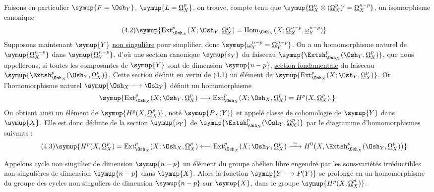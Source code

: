 Faisons en particulier $\symup{F=\Osh_Y}$, $\symup{L=\underline{\Omega}_X^{p}}$, on trouve, compte tenu
que $\symup{\underline{\Omega}_X^{n}\otimes(\underline{\Omega}_X^{p})'=\underline{\Omega}_X^{n-p}}$, un isomorphisme
canonique
\begin{equation}\tag{4.2}
  \symup{\operatorname{Ext}_{\Osh_X}^{p}(X;\Osh_Y,\underline{\Omega}_X^{p})
  =\operatorname{Hom}_{\Osh_X}
  (X;\underline{\Omega}_X^{n-p},\underline{\omega}_Y^{n-p})}
\end{equation}
Supposons maintenant $\symup{Y}$ \uline{non singulière} pour simplifier, donc
$\symup{\underline{\omega}_Y^{n-p}=\underline{\Omega}_Y^{n-p}}$. On a un homomorphisme naturel de
$\symup{\underline{\Omega}_X^{n-p}}$ dans $\symup{\underline{\Omega}_Y^{n-p}}$, d'où une section canonique $\symup{s_Y}$ du
faisceau $\symup{\Extsh_{\Osh_X}^{p}(\Osh_Y,\underline{\Omega}_X^{p})}$, que nous appellerons, si
toutes les composantes de $\symup{Y}$ sont de dimension $\symup{n-p}$, \uline{section
fondamentale} du faisceau $\symup{\Extsh_{\Osh_X}^{p}(\Osh_Y,\underline{\Omega}_X^{p})}$. Cette
section définit en vertu de (4.1) un élément de
$\symup{\operatorname{Ext}_{\Osh_X}^{p}(X;\Osh_Y,\underline{\Omega}_X^{p})}$. Or l'homomorphisme
naturel $\symup{\Osh_X\longrightarrow\Osh_Y}$ définit un homomorphisme
\[
  \symup{\operatorname{Ext}_{\Osh_X}^{p}(X;\Osh_Y,\underline{\Omega}_X^{p})
  \longrightarrow
  \operatorname{Ext}_{\Osh_X}^{p}(X;\Osh_X,\underline{\Omega}_X^{p})
  =H^{p}(X,\underline{\Omega}_X^{p}).}
\]
On obtient ainsi un élément de $\symup{H^{p}(X,\underline{\Omega}_X^{p})}$, noté $\symup{P_X(Y)}$ et appelé
\uline{classe de cohomologie de} $\symup{Y}$ \uline{dans} $\symup{X}$. Elle est donc déduite de la section
$\symup{s_Y}$ de $\symup{\Extsh_{\Osh_X}^{p}(\Osh_Y,\underline{\Omega}_X^{p})}$ par le diagramme
d'homomorphismes suivants :
\begin{equation}\tag{4.3}
\symup{H^{p}(X,\underline{\Omega}_X^{p})
=\operatorname{Ext}_{\Osh_X}^{p}(X;\Osh_X,\underline{\Omega}_X^{p})
\longleftarrow\operatorname{Ext}_{\Osh_X}^{p}(X;\Osh_Y,\underline{\Omega}_X^{p})
\xrightarrow{\ \sim\ }
H^{0}\!\left(X,\Extsh_{\Osh_X}^{p}(\Osh_Y,\underline{\Omega}_X^{p})\right)}
\end{equation}

Appelons \uline{cycle non singulier} de dimension $\symup{n-p}$ un élément du groupe
abélien libre engendré par les sous-variétés irréductibles non singulières de
dimension $\symup{n-p}$ dans $\symup{X}$. Alors la fonction $\symup{Y\longrightarrow P(Y)}$ se prolonge en
un homomorphisme du groupe des cycles non singuliers de dimension $\symup{n-p}$ sur $\symup{X}$,
dans le groupe $\symup{H^{p}(X,\underline{\Omega}_X^{p})}$.

